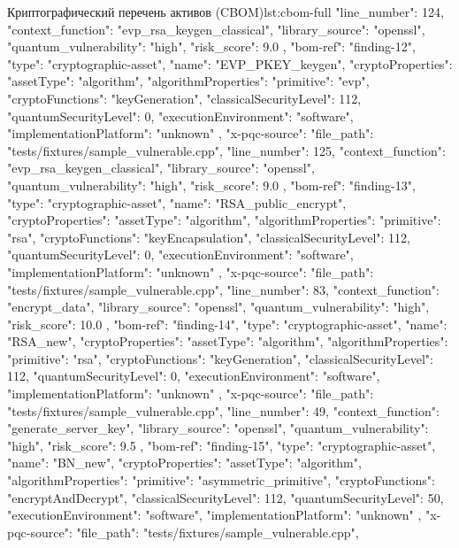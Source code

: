 \documentclass{itmo-vkr}
\begin{document}
\begin{itmolisting}[JSON]{Криптографический перечень активов (CBOM)}{lst:cbom-full}
{{{				"line_number": 124,
				"context_function": "evp_rsa_keygen_classical",
				"library_source": "openssl",
				"quantum_vulnerability": "high",
				"risk_score": 9.0
			}
		},
		{
			"bom-ref": "finding-12",
			"type": "cryptographic-asset",
			"name": "EVP_PKEY_keygen",
			"cryptoProperties": {
				"assetType": "algorithm",
				"algorithmProperties": {
					"primitive": "evp",
					"cryptoFunctions": "keyGeneration",
					"classicalSecurityLevel": 112,
					"quantumSecurityLevel": 0,
					"executionEnvironment": "software",
					"implementationPlatform": "unknown"
				}
			},
			"x-pqc-source": {
				"file_path": "tests/fixtures/sample_vulnerable.cpp",
				"line_number": 125,
				"context_function": "evp_rsa_keygen_classical",
				"library_source": "openssl",
				"quantum_vulnerability": "high",
				"risk_score": 9.0
			}
		},
		{
			"bom-ref": "finding-13",
			"type": "cryptographic-asset",
			"name": "RSA_public_encrypt",
			"cryptoProperties": {
				"assetType": "algorithm",
				"algorithmProperties": {
					"primitive": "rsa",
					"cryptoFunctions": "keyEncapsulation",
					"classicalSecurityLevel": 112,
					"quantumSecurityLevel": 0,
					"executionEnvironment": "software",
					"implementationPlatform": "unknown"
				}
			},
			"x-pqc-source": {
				"file_path": "tests/fixtures/sample_vulnerable.cpp",
				"line_number": 83,
				"context_function": "encrypt_data",
				"library_source": "openssl",
				"quantum_vulnerability": "high",
				"risk_score": 10.0
			}
		},
		{
			"bom-ref": "finding-14",
			"type": "cryptographic-asset",
			"name": "RSA_new",
			"cryptoProperties": {
				"assetType": "algorithm",
				"algorithmProperties": {
					"primitive": "rsa",
					"cryptoFunctions": "keyGeneration",
					"classicalSecurityLevel": 112,
					"quantumSecurityLevel": 0,
					"executionEnvironment": "software",
					"implementationPlatform": "unknown"
				}
			},
			"x-pqc-source": {
				"file_path": "tests/fixtures/sample_vulnerable.cpp",
				"line_number": 49,
				"context_function": "generate_server_key",
				"library_source": "openssl",
				"quantum_vulnerability": "high",
				"risk_score": 9.5
			}
		},
		{
			"bom-ref": "finding-15",
			"type": "cryptographic-asset",
			"name": "BN_new",
			"cryptoProperties": {
				"assetType": "algorithm",
				"algorithmProperties": {
					"primitive": "asymmetric_primitive",
					"cryptoFunctions": "encryptAndDecrypt",
					"classicalSecurityLevel": 112,
					"quantumSecurityLevel": 50,
					"executionEnvironment": "software",
					"implementationPlatform": "unknown"
				}
			},
			"x-pqc-source": {
				"file_path": "tests/fixtures/sample_vulnerable.cpp",
}}}
\end{itmolisting}
\end{document}
